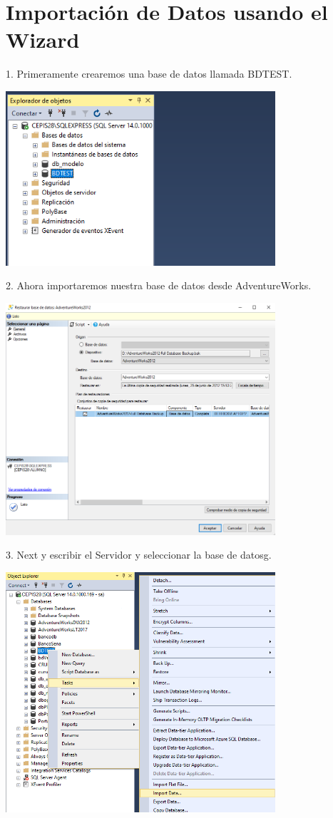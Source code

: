 \section{Importación de Datos usando el Wizard} 

1. Primeramente crearemos una base de datos llamada BDTEST.
	\begin{center}
	\includegraphics[width=10cm]{imagenes/img1}
	\end{center}	


2. Ahora importaremos nuestra base de datos desde AdventureWorks.
	\begin{center}
	\includegraphics[width=10cm]{imagenes/img2}
	\end{center}	

3. Next y escribir el Servidor y seleccionar la base de datosg.
	\begin{center}
	\includegraphics[width=10cm]{imagenes/img3}
	\end{center}	

